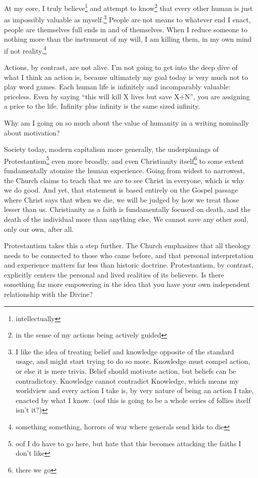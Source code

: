 \documentclass[12pt]{article}
\newcommand{\say}[1]{``#1''}
\renewcommand{\,}{\textsuperscript{,}}
\begin{document}
At my core, I truly believe\footnote{intellectually} and attempt to know\footnote{in the sense of my actions being actively guided} that every other human is just as impossibly valuable as myself.\footnote{I like the idea of treating belief and knowledge opposite of the standard usage, and might start trying to do so more. Knowledge must compel action, or else it is mere trivia. Belief should motivate action, but beliefs can be contradictory. Knowledge cannot contradict Knowledge, which means my worldview and every action I take is, by very nature of being an action I take, enacted by what I know. (oof this is going to be a whole series of follies itself isn't it?)}  
People are not means to whatever end I enact, people are themselves full ends in and of themselves.  
When I reduce someone to nothing more than the instrument of my will, I am killing them, in my own mind if not reality.\footnote{something something, horrors of war where generals send kids to die}

Actions, by contrast, are not alive.  
I'm not going to get into the deep dive of what I think an action is, because ultimately my goal today is very much not to play word games.  
Each human life is infinitely and incomparably valuable: priceless.  
Even by saying \say{this will kill X lives but save X+N}, you are assigning a price to the life.  
Infinity plus infinity is the same sized infinity.

Why am I going on so much about the value of humanity in a writing nominally about motivation?

Society today, modern capitalism more generally, the underpinnings of Protestantism\footnote{oof I do have to go here, but hate that this becomes attacking the faiths I don't like} even more broadly, and even Christianity itself\footnote{there we go} to some extent fundamentally atomize the human experience.  
Going from widest to narrowest, the Church claims to teach that we are to see Christ in everyone, which is why we do good.  
And yet, that statement is based entirely on the Gospel passage where Christ says that when we die, we will be judged by how we treat those lesser than us.  
Christianity as a faith is fundamentally focused on death, and the death of the individual more than anything else.  
We cannot save any other soul, only our own, after all.

Protestantism takes this a step further.  
The Church emphasizes that all theology needs to be connected to those who came before, and that personal interpretation and experience matters far less than historic doctrine.  
Protestantism, by contrast, explicitly centers the personal and lived realities of its believers.  
Is there something far more empowering in the idea that you have your own independent relationship with the Divine?
\end{document}
